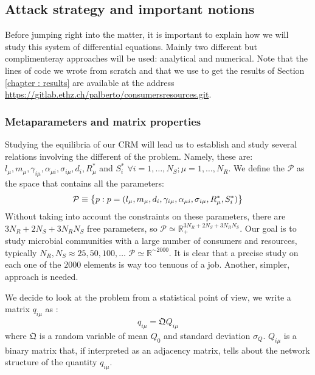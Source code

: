 \documentclass[12pt, titlepage]{report}
\begin{document}
\subsection{Attack strategy and important notions}
Before jumping right into the matter, it is important to explain how we will study this system of differential equations. Mainly two different but complimenteray approaches will be used: analytical and numerical. Note that the %
lines of code we wrote from scratch and that we use to get the results of Section \ref{chapter : results} are available at the address \url{https://gitlab.ethz.ch/palberto/consumersresources.git}.

\subsubsection{Metaparameters and matrix properties}\label{sec : intro metaparameters and matrix properties}
Studying the equilibria of our CRM will lead us to establish and study several relations involving the different  of the problem. Namely, these are: $l_\mu, m_\mu, \gamma_{i\mu}, \alpha_{\mu i}, \sigma_{i\mu}, d_i, R^*_\mu$ and $S^*_i$ $\forall i=1, \dots, N_S; \mu=1, \dots, N_R$.
We define the  $\mathcal{P}$ as the space that contains all the parameters:
\begin{equation}
\mathcal{P} \equiv \left\{ p: p = (l_\mu,  m_\mu,d_i,  \gamma_{i\mu}, \alpha_{\mu i}, \sigma_{i\mu}, R^*_\mu, S^*_i) \right\}
\end{equation}
Without taking into account the constraints on these parameters, there are $3N_R+2N_S+3N_RN_S$ free parameters, so $\mathcal{P} \simeq \mathbb{R}_+^{3 N_R+2 N_S + 3 N_R N_S}$.
Our goal is to study microbial communities with a large number of consumers and resources, typically $N_R, N_S \approx 25, 50, 100, \dots$ \ie $\mathcal{P} \simeq \mathbb{R}^{\sim 2000}$. It is clear that a precise study on each one of the $2000$ elements is way too tenuous of a job. Another, simpler, approach is needed.

We decide to look at the problem from a statistical point of view, \ie we write a matrix $q_{i\mu}$ as \cite{pascual-garcia_mutualism_2017}:
 \begin{equation}
 q_{i\mu} = \mathfrak{Q} Q_{i\mu}
 \end{equation}
where $\mathfrak{Q}$ is a random variable of mean $Q_0$ and standard deviation $\sigma_Q$. $Q_{i\mu}$ is a binary matrix that, if interpreted as an adjacency matrix, tells about the network structure of the quantity $q_{i\mu}$.
\end{document}
